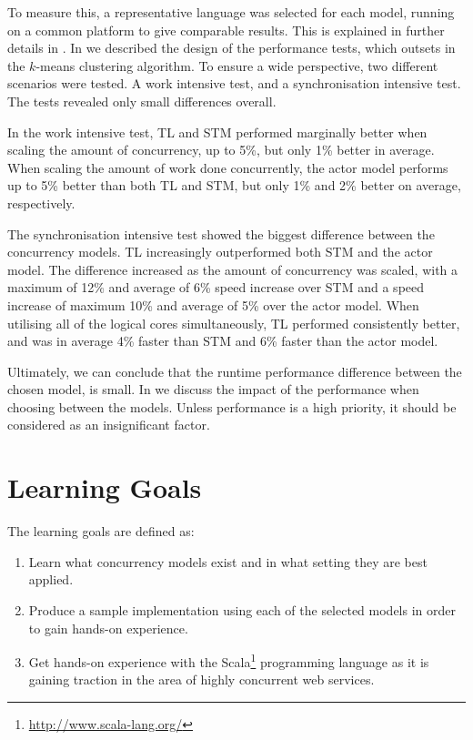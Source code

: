 To measure this, a representative language was selected for each model, running on a common platform to give comparable results. This is explained in further details in . In  we described the design of the performance tests, which outsets in the $k$-means clustering algorithm. To ensure a wide perspective, two different scenarios were tested. A work intensive test, and a synchronisation intensive test. The tests revealed only small differences overall. 

In the work intensive test, \ac{TL} and \ac{STM} performed marginally better when scaling the amount of concurrency, up to 5\%, but only 1\% better in average. When scaling the amount of work done concurrently, the actor model performs up to 5\% better than both \ac{TL} and \ac{STM}, but only 1\% and 2\% better on average, respectively.

The synchronisation intensive test showed the biggest difference between the concurrency models. \ac{TL} increasingly outperformed both \ac{STM} and the actor model. The difference increased as the amount of concurrency was scaled, with a maximum of 12\% and average of 6\% speed increase over \ac{STM} and a speed increase of maximum 10\% and average of 5\% over the actor model. When utilising all of the logical cores simultaneously, \ac{TL} performed consistently better, and was in average 4\% faster than \ac{STM} and 6\% faster than the actor model.

Ultimately, we can conclude that the runtime performance difference between the chosen model, is small. In  we discuss the impact of the performance when choosing between the models. Unless performance is a high priority, it should be considered as an insignificant factor.

\section{Learning Goals}

The learning goals are defined as:
\begin{enumerate}
\item Learn what concurrency models exist and in what setting they are best applied.
\item Produce a sample implementation using each of the selected models in order to gain hands-on experience.
\item Get hands-on experience with the Scala\footnote{\url{http://www.scala-lang.org/}} programming language as it is gaining traction in the area of highly concurrent web services.
\end{enumerate}
\worksheetend